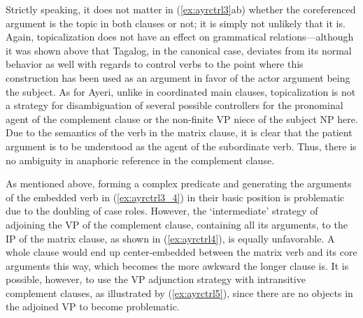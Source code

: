 \begin{figure}

\xe%
\end{figure}

Strictly speaking, it does not matter in (\ref{ex:ayrctrl3}ab) whether the
coreferenced argument is the topic in both clauses or not; it is simply not
unlikely that it is. Again, topicalization does not have an effect on
grammatical relations---although it was shown above that Tagalog, in the
canonical case, deviates from its normal behavior as well with regards to
control verbs to the point where this construction has been used as an argument
in favor of the actor argument being the subject. As for Ayeri, unlike in
coordinated main clauses, topicalization is not a strategy for disambiguation
of several possible controllers for the pronominal agent of the complement
clause or the non-finite VP niece of the subject NP here. Due to the
semantics of the verb in the matrix clause, it is clear that the patient
argument is to be understood as the agent of the subordinate verb. Thus, there
is no ambiguity in anaphoric reference in the complement clause.

As mentioned above, forming a complex predicate and generating the arguments of
the embedded verb in (\ref{ex:ayrctrl3_4}) in their basic position is
problematic due to the doubling of case roles. However, the `intermediate'
strategy of adjoining the VP of the complement clause, containing all its
arguments, to the IP of the matrix clause, as shown in (\ref{ex:ayrctrl4}), is
equally unfavorable. A whole clause would end up center-embedded between the
matrix verb and its core arguments this way, which becomes the more awkward the
longer clause is. It is possible, however, to use the VP adjunction strategy
with intransitive complement clauses, as illustrated by (\ref{ex:ayrctrl5}),
since there are no objects in the adjoined VP to become problematic.

